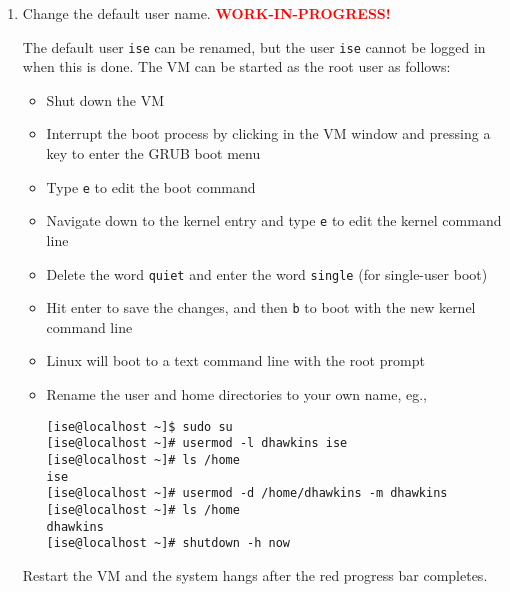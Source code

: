 \begin{enumerate}
\begin{enumerate}
\begin{verbatim}
# Change the last line to
HOSTNAME=xilinx-ise-14_7-vm
	
[ise@localhost ~]# service network restart

# Fails with an eth0 error

[ise@localhost ~]# shutdown -h now
\end{verbatim}
\textcolor{red}{\bf TODO: Understand why network restart did not work!}

Restart the VM and the terminal prompt changes to:
%
\begin{verbatim}
[ise@xilinx-ise-14_7-vm ~]$
\end{verbatim}
Note that the host name must not include a period, since periods are used for domain names.
This is why the underscore was used in the ISE version number.

\item Change the default user name. \textcolor{red}{\bf WORK-IN-PROGRESS!}

The default user \verb+ise+ can be renamed, but the user \verb+ise+ cannot be logged in
when this is done. The VM can be started as the root user as follows:
%
\begin{itemize}
\item Shut down the VM
\item Interrupt the boot process by clicking in the VM window and pressing a key to
enter the GRUB boot menu
\item Type \verb+e+ to edit the boot command
\item Navigate down to the kernel entry and type \verb+e+ to edit the kernel command line
\item Delete the word \verb+quiet+ and enter the word \verb+single+ (for single-user boot)
\item Hit enter to save the changes, and then \verb+b+ to boot with the new kernel command line
\item Linux will boot to a text command line with the root prompt
\item Rename the user and home directories to your own name, eg.,
%
\begin{verbatim}
[ise@localhost ~]$ sudo su
[ise@localhost ~]# usermod -l dhawkins ise
[ise@localhost ~]# ls /home
ise
[ise@localhost ~]# usermod -d /home/dhawkins -m dhawkins
[ise@localhost ~]# ls /home
dhawkins
[ise@localhost ~]# shutdown -h now
\end{verbatim}
\end{itemize}
%
Restart the VM and the system hangs after the red progress bar completes.


\end{enumerate}
\end{enumerate}
